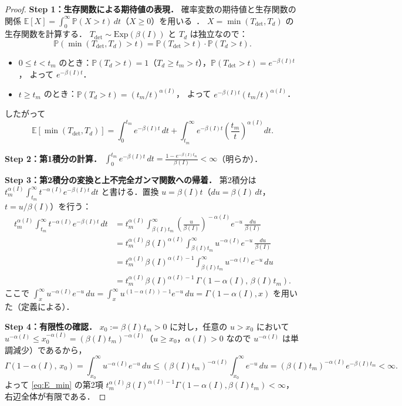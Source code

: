 \documentclass[12pt,a4paper]{article}
\theoremstyle{plain}
\theoremstyle{definition}
\theoremstyle{remark}
\newcommand{\E}{\mathbb{E}}
\newcommand{\Prob}{\mathbb{P}}
\newcommand{\Tdet}{T_{\mathrm{det}}}
\newcommand{\betaI}{\beta(I)}
\newcommand{\alphI}{\alpha(I)}
\begin{document}
\begin{proof}
\textbf{Step 1：生存関数による期待値の表現．}
確率変数の期待値と生存関数の関係
$\E[X]=\int_0^\infty\Prob(X>t)\,dt$（$X\ge0$）を用いる~\cite{klein2003,ross2014}．
$X=\min(\Tdet,T_d)$ の生存関数を計算する．
$\Tdet\sim\mathrm{Exp}(\betaI)$ と $T_d$ は独立なので：
\[
\Prob\!\left(\min(\Tdet,T_d)>t\right)
=\Prob(\Tdet>t)\cdot\Prob(T_d>t).
\]
\begin{itemize}[leftmargin=2em]
\item $0\le t<t_m$ のとき：$\Prob(T_d>t)=1$（$T_d\ge t_m>t$），$\Prob(\Tdet>t)=e^{-\betaI t}$，
  よって $e^{-\betaI t}$．
\item $t\ge t_m$ のとき：$\Prob(T_d>t)=(t_m/t)^{\alphI}$，
  よって $e^{-\betaI t}(t_m/t)^{\alphI}$．
\end{itemize}
したがって
\begin{equation}\label{eq:Emin_split}
\E[\min(\Tdet,T_d)]
=\int_0^{t_m}e^{-\betaI t}\,dt
+\int_{t_m}^\infty e^{-\betaI t}\!\left(\frac{t_m}{t}\right)^{\!\alphI}\!\!dt.
\end{equation}

\textbf{Step 2：第1積分の計算．}
$\displaystyle\int_0^{t_m}e^{-\betaI t}\,dt
=\frac{1-e^{-\betaI t_m}}{\betaI}<\infty$（明らか）．

\textbf{Step 3：第2積分の変換と上不完全ガンマ関数への帰着．}
第2積分は
$t_m^{\alphI}\displaystyle\int_{t_m}^\infty t^{-\alphI}e^{-\betaI t}\,dt$
と書ける．置換 $u=\betaI t$（$du=\betaI\,dt$，$t=u/\betaI$）を行う：
\begin{align*}
t_m^{\alphI}\int_{t_m}^\infty t^{-\alphI}e^{-\betaI t}\,dt
&=t_m^{\alphI}\int_{\betaI t_m}^\infty \!\!\left(\frac{u}{\betaI}\right)^{\!-\alphI}\!e^{-u}\,\frac{du}{\betaI}\\
&=t_m^{\alphI}\betaI^{\alphI}\int_{\betaI t_m}^\infty u^{-\alphI}e^{-u}\,\frac{du}{\betaI}\\
&=t_m^{\alphI}\betaI^{\alphI-1}\int_{\betaI t_m}^\infty u^{-\alphI}e^{-u}\,du\\
&=t_m^{\alphI}\betaI^{\alphI-1}\,\Gamma(1-\alphI,\,\betaI t_m).
\end{align*}
ここで $\int_x^\infty u^{-\alphI}e^{-u}\,du=\int_x^\infty u^{(1-\alphI)-1}e^{-u}\,du=\Gamma(1-\alphI,x)$
を用いた（定義による）．

\textbf{Step 4：有限性の確認．}
$x_0:=\betaI t_m>0$ に対し，任意の $u>x_0$ において
$u^{-\alphI}\le x_0^{-\alphI}=(\betaI t_m)^{-\alphI}$（$u\ge x_0$，$\alphI>0$ なので $u^{-\alphI}$ は単調減少）であるから，
\[
\Gamma(1-\alphI,\,x_0)=\int_{x_0}^\infty u^{-\alphI}e^{-u}\,du
\le(\betaI t_m)^{-\alphI}\int_{x_0}^\infty e^{-u}\,du
=(\betaI t_m)^{-\alphI}e^{-\betaI t_m}<\infty.
\]
よって \eqref{eq:E_min} の第2項 $t_m^{\alphI}\betaI^{\alphI-1}\Gamma(1-\alphI,\betaI t_m)<\infty$，
右辺全体が有限である．
\end{proof}
\end{document}
